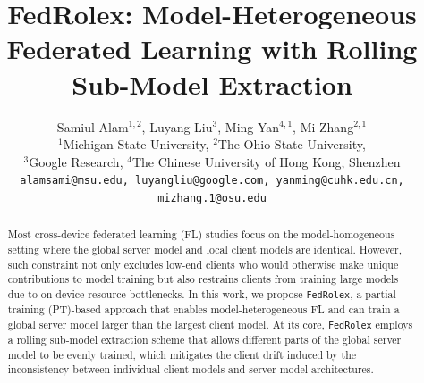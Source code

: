 \documentclass{article}
\title{FedRolex: Model-Heterogeneous Federated Learning with Rolling Sub-Model Extraction}
\author{
    Samiul Alam$^{1,2}$, Luyang Liu$^3$, Ming Yan$^{4,1}$, Mi Zhang$^{2,1}$\\
    \quad $^1$Michigan State University, $^2$The Ohio State University, \\\quad $^3$Google Research, \quad $^4$The Chinese University of Hong Kong, Shenzhen \\
    {\small\texttt{alamsami@msu.edu, luyangliu@google.com, yanming@cuhk.edu.cn, mizhang.1@osu.edu}}
}
\newcommand{\Luyang}[1]{\textcolor{orange}{(Luyang: #1)}}
\begin{document}
\maketitle
\begin{abstract}


Most cross-device federated learning (FL) studies focus on the model-homogeneous setting where the global server model and local client models are identical. However, such constraint not only excludes low-end clients who would otherwise make unique contributions to model training but also restrains clients from training large models due to on-device resource bottlenecks.
%
In this work, we propose \texttt{FedRolex}, a partial training (PT)-based approach that enables model-heterogeneous FL and can train a global server model larger than the largest client model. At its core, \texttt{FedRolex} employs a rolling sub-model extraction scheme that allows different parts of the global server model to be evenly trained, which mitigates the client drift induced by the inconsistency between individual client models and server model architectures. 
%

\end{abstract}
\end{document}
